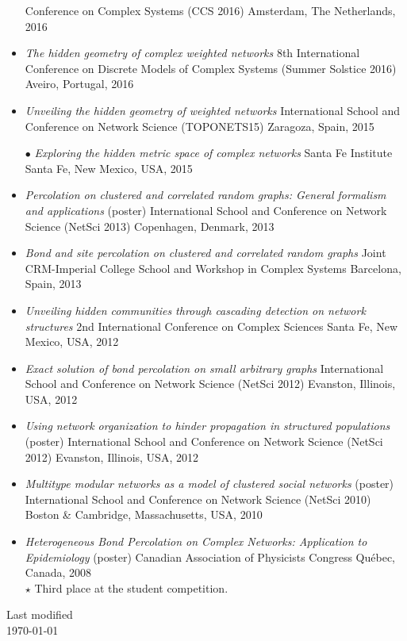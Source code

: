 \documentclass[11pt]{article}
\begin{document}
\begin{itemize}[itemsep=0.5em]
  Conference on Complex Systems (CCS 2016)\split
  Amsterdam, The Netherlands, 2016
%
  \item \textit{The hidden geometry of complex weighted networks}\split
  8th International Conference on Discrete Models of Complex Systems (Summer Solstice 2016)\split
  Aveiro, Portugal, 2016
%
  \item \textit{Unveiling the hidden geometry of weighted networks}\split
  International School and Conference on Network Science (TOPONETS15)\split
  Zaragoza, Spain, 2015
%
  \item[$\bullet$] \textit{Exploring the hidden metric space of complex networks}\split
  Santa Fe Institute\split
  Santa Fe, New Mexico, USA, 2015
%
  \item \textit{Percolation on clustered and correlated random graphs: General formalism and applications} (poster)\split
  International School and Conference on Network Science (NetSci 2013)\split
  Copenhagen, Denmark, 2013
%
  \item \textit{Bond and site percolation on clustered and correlated random graphs}\split
  Joint CRM-Imperial College School and Workshop in Complex Systems\split
  Barcelona, Spain, 2013
%
  \item \textit{Unveiling hidden communities through cascading detection on network structures}\split
  2nd International Conference on Complex Sciences\split
  Santa Fe, New Mexico, USA, 2012
%
  \item \textit{Exact solution of bond percolation on small arbitrary graphs}\split
  International School and Conference on Network Science (NetSci 2012)\split
  Evanston, Illinois, USA, 2012
%
  \item \textit{Using network organization to hinder propagation in structured populations} (poster)\split
  International School and Conference on Network Science (NetSci 2012)\split
  Evanston, Illinois, USA, 2012
%
  \item \textit{Multitype modular networks as a model of clustered social networks} (poster)\split
  International School and Conference on Network Science (NetSci 2010)\split
  Boston \& Cambridge, Massachusetts, USA, 2010
%
  \item \textit{Heterogeneous Bond Percolation on Complex Networks: Application to Epidemiology} (poster)\split
  Canadian Association of Physicists Congress\split
  Qu\'ebec, Canada, 2008\\
  {\small $\star$ Third place at the student competition.}\\
%
\end{itemize}
%
%
%
%
%
\vfill
%
\begin{flushright}
  \tiny Last modified\\ \today
\end{flushright}
%
\end{document}
